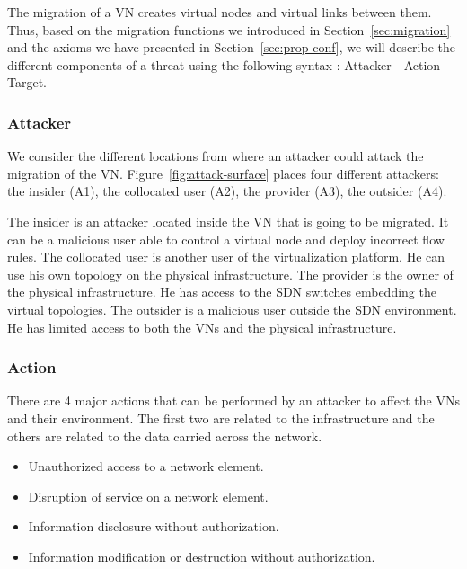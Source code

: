\label{sec:attacker-model}
The migration of a VN creates virtual nodes and virtual links between them.
Thus, based on  the migration functions we introduced in Section~\ref{sec:migration} and the axioms we have presented in Section~\ref{sec:prop-conf}, we will describe the different components of a threat using the following syntax
: Attacker - Action - Target.




\subsubsection{Attacker}
We consider the different locations from where an attacker could attack the migration of the VN. 
Figure~\ref{fig:attack-surface} places four different attackers: the insider (A1), the collocated user (A2), the provider (A3), the outsider (A4).

The insider is an attacker located inside the VN that is going to be migrated.
It can be a malicious user able to control a virtual node and deploy incorrect flow rules.
The collocated user is another user of the virtualization platform.
He can use his own topology on the physical infrastructure.
The provider is the owner of the physical infrastructure.
He has access to the SDN switches embedding the virtual topologies.
The outsider is a malicious user outside the SDN environment.
He has limited access to both the VNs and the physical infrastructure.

\subsubsection{Action}
There are 4 major actions that can be performed by an attacker to affect the VNs and their environment.
The first two are related to the infrastructure and the others are related to the data carried across the network.
\begin{itemize}
\item Unauthorized access to a network element.
\item Disruption of service on a network element.
\item Information disclosure without authorization.
\item Information modification or destruction without authorization.
\end{itemize}

